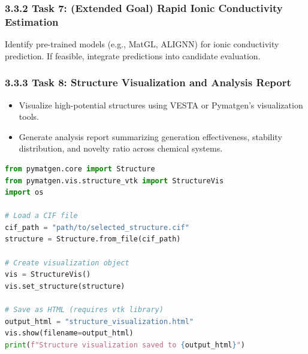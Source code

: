 \documentclass[letterpaper]{article} %
\begin{document}
\subsubsection{3.3.2 Task 7: (Extended Goal) Rapid Ionic Conductivity Estimation}
Identify pre-trained models (e.g., MatGL, ALIGNN) for ionic conductivity prediction. If feasible, integrate predictions into candidate evaluation.

\subsubsection{3.3.3 Task 8: Structure Visualization and Analysis Report}
\begin{itemize}
    \item Visualize high-potential structures using VESTA or Pymatgen's visualization tools.
    \item Generate analysis report summarizing generation effectiveness, stability distribution, and novelty ratio across chemical systems.
\end{itemize}

% 
% 
% 
\begin{lstlisting}[language=python, caption=Visualization Example with Pymatgen]
from pymatgen.core import Structure
from pymatgen.vis.structure_vtk import StructureVis
import os

# Load a CIF file
cif_path = "path/to/selected_structure.cif"
structure = Structure.from_file(cif_path)

# Create visualization object
vis = StructureVis()
vis.set_structure(structure)

# Save as HTML (requires vtk library)
output_html = "structure_visualization.html"
vis.show(filename=output_html)
print(f"Structure visualization saved to {output_html}")
\end{lstlisting}
\end{document}
